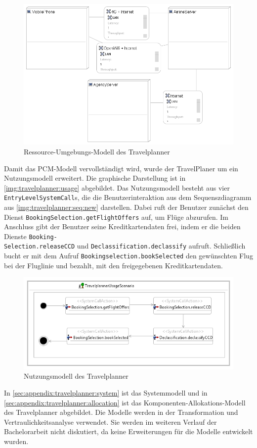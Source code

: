 \begin{figure}[h]
	\centering
  	\includegraphics[width=1\textwidth]{images/travelplanner_resource.png}
	\caption{Ressource-Umgebungs-Modell des Travelplanner}
	\label{img:travelplanner:res}
\end{figure} 
Damit das PCM-Modell vervollständigt wird, wurde der TravelPlaner um ein Nutzungsmodell erweitert. Die graphische Darstellung ist in \autoref{img:travelplanner:usage} abgebildet. Das Nutzungsmodell besteht aus vier \texttt{EntryLevelSystemCall}s, die die Benutzerinteraktion aus dem Sequenszdiagramm aus \autoref{img:travelplanner:seq:new} darstellen. Dabei ruft der Benutzer zunächst den Dienst \texttt{BookingSelection.getFlightOffers} auf, um Flüge abzurufen. Im Anschluss gibt der Benutzer seine Kreditkartendaten frei, indem er die beiden Dienste \texttt{Booking-\\Selection.releaseCCD} und \texttt{Declassification.declassify} aufruft. Schließlich bucht er mit dem Aufruf \texttt{Bookingselection.bookSelected} den gewünschten Flug bei der Fluglinie und bezahlt, mit den freigegebenen Kreditkartendaten. \par
\begin{figure}[h]
	\centering
  	\includegraphics[width=1\textwidth]{images/travelplanner_usage.png}
	\caption{Nutzungsmodell des Travelplanner}
	\label{img:travelplanner:usage}
\end{figure} 
In \autoref{sec:appendix:travelplanner:system} ist das Systemmodell und in \autoref{sec:appendix:travelplanner:allocation} ist das Komponenten-Allokations-Modell des Travelplanner abgebildet. Die Modelle werden in der Transformation und Vertraulichkeitsanalyse verwendet. Sie werden im weiteren Verlauf der Bachelorarbeit nicht diskutiert, da keine Erweiterungen für die Modelle entwickelt wurden.

